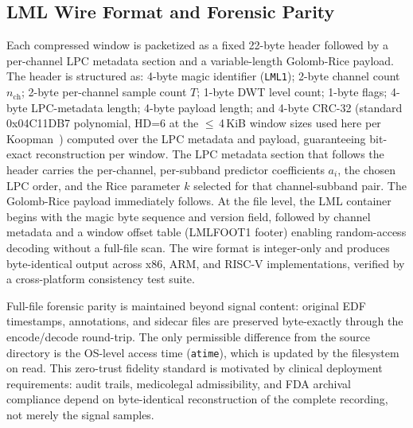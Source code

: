 \documentclass[journal]{IEEEtran}
\begin{document}
\subsection{LML Wire Format and Forensic Parity}
Each compressed window is packetized as a fixed 22-byte header
followed by a per-channel LPC metadata section and a variable-length
Golomb-Rice payload. The header is structured as: 4-byte magic
identifier (\texttt{LML1}); 2-byte channel count $n_{\text{ch}}$;
2-byte per-channel sample count $T$; 1-byte DWT level count;
1-byte flags; 4-byte LPC-metadata length; 4-byte payload length;
and 4-byte CRC-32 (standard 0x04C11DB7 polynomial, HD=6 at the
$\leq$\,4\,KiB window sizes used here per
Koopman~\cite{koopman2002crc}) computed over the LPC metadata and
payload,
guaranteeing bit-exact reconstruction per window. The LPC metadata
section that follows the header carries the per-channel, per-subband
predictor coefficients $a_i$, the chosen LPC order, and the Rice
parameter $k$ selected for that channel-subband pair. The
Golomb-Rice payload immediately follows. At the file level, the LML
container begins with the magic byte sequence and version field,
followed by channel metadata and a window offset table (LMLFOOT1
footer) enabling random-access decoding without a full-file scan. The wire format is integer-only and produces byte-identical
output across x86, ARM, and RISC-V implementations, verified by a
cross-platform consistency test suite.

Full-file forensic parity is maintained beyond signal content:
original EDF timestamps, annotations, and sidecar files are preserved
byte-exactly through the encode/decode round-trip. The only
permissible difference from the source directory is the OS-level
access time (\texttt{atime}), which is updated by the filesystem on
read. This zero-trust fidelity standard is motivated by clinical
deployment requirements: audit trails, medicolegal admissibility, and
FDA archival compliance depend on byte-identical reconstruction of
the complete recording, not merely the signal samples.
\end{document}
